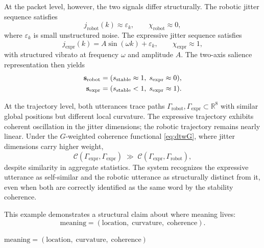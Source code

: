 \documentclass[12pt, a4paper]{article}
\newcommand{\hyperstrong}[1]{\textbf{\Large #1}}
\begin{document}
At the packet level, however, the two signals differ structurally. The robotic jitter sequence satisfies
\begin{equation}
j_{\mathrm{robot}}(k) \approx \varepsilon_k, \qquad \chi_{\mathrm{robot}} \approx 0,
\label{eq:jrobot}
\end{equation}
where $\varepsilon_k$ is small unstructured noise. The expressive jitter sequence satisfies
\begin{equation}
j_{\mathrm{expr}}(k) = A\sin(\omega k) + \varepsilon_k, \qquad \chi_{\mathrm{expr}} \approx 1,
\label{eq:jexpr}
\end{equation}
with structured vibrato at frequency $\omega$ and amplitude $A$. The two-axis salience representation then yields
\begin{align}
\mathbf{s}_{\mathrm{robot}} &= (s_{\mathrm{stable}} \approx 1,\; s_{\mathrm{expr}} \approx 0), \notag\\
\mathbf{s}_{\mathrm{expr}} &= (s_{\mathrm{stable}} < 1,\; s_{\mathrm{expr}} \approx 1). \label{eq:scomparison}
\end{align}

At the trajectory level, both utterances trace paths $\Gamma_{\mathrm{robot}}, \Gamma_{\mathrm{expr}} \subset \mathbb{R}^8$ with similar global positions but different local curvature. The expressive trajectory exhibits coherent oscillation in the jitter dimensions; the robotic trajectory remains nearly linear. Under the $G$-weighted coherence functional \eqref{eq:dtwG}, where jitter dimensions carry higher weight,
\begin{equation}
\mathcal{C}(\Gamma_{\mathrm{expr}}, \Gamma_{\mathrm{expr}}) \;\gg\; \mathcal{C}(\Gamma_{\mathrm{expr}}, \Gamma_{\mathrm{robot}}),
\label{eq:Ccomparison}
\end{equation}
despite similarity in aggregate statistics. The system recognizes the expressive utterance as self-similar and the robotic utterance as structurally distinct from it, even when both are correctly identified as the same word by the stability coherence.

This example demonstrates a structural claim about where meaning lives:
\begin{equation}
\text{meaning} = (\text{location},\; \text{curvature},\; \text{coherence}).
\label{eq:meaning}
\end{equation}

\begin{center}
\hyperstrong{$\text{meaning} = (\text{location},\; \text{curvature},\; \text{coherence})$}
\end{center}
\end{document}
